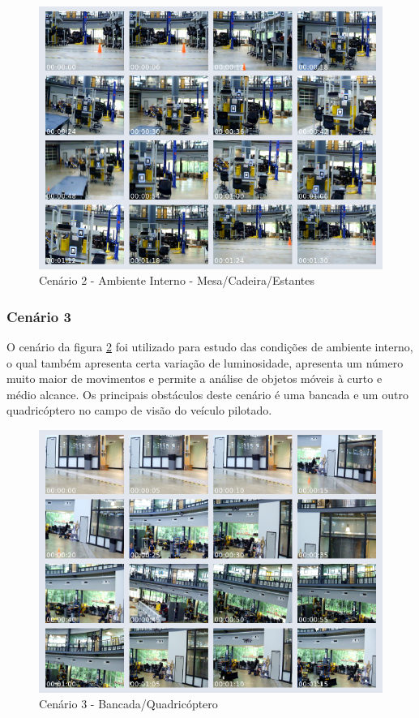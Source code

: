 \begin{figure}[H]
 	\centering
 	\includegraphics[scale=0.50]{./Resources/thumb_video12_l.png}
 	\caption{Cenário 2 - Ambiente Interno - Mesa/Cadeira/Estantes}
 	\label{thumb_video12_l}
\end{figure}

\subsubsection{Cenário 3}

O cenário da figura \ref{thumb_video15} foi utilizado para estudo das condições de ambiente interno, o qual também apresenta certa variação de luminosidade, apresenta um número muito maior de movimentos e permite a análise de objetos móveis à curto e médio alcance. Os principais obstáculos deste cenário  é uma bancada e um outro quadricóptero no campo de visão do veículo pilotado.

\begin{figure}[H]
 	\centering
 	\includegraphics[scale=0.50]{./Resources/thumb_video15.png}
 	\caption{Cenário 3 - Bancada/Quadricóptero}
 	\label{thumb_video15}
\end{figure}


